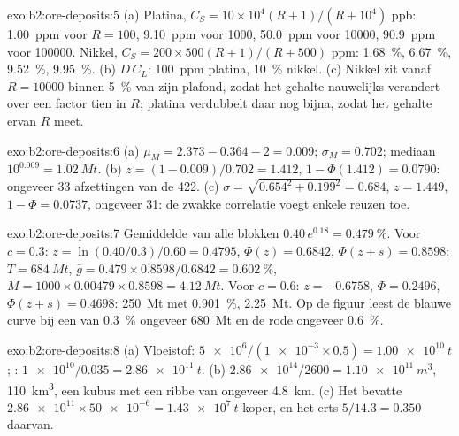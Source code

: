 \begin{solution}{exo:b2:ore-deposits:5}
(a) Platina, $C_S = 10 \times 10^4 (R + 1)/(R + 10^4)$ ppb: \qty{1.00}{ppm} voor $R = 100$,
\qty{9.10}{ppm} voor \num{1000}, \qty{50.0}{ppm} voor \num{10000}, \qty{90.9}{ppm} voor \num{100000}.
Nikkel, $C_S = 200 \times 500 (R + 1)/(R + 500)$ ppm: \qty{1.68}{\percent}, \qty{6.67}{\percent},
\qty{9.52}{\percent}, \qty{9.95}{\percent}. (b) $D\,C_L$: \qty{100}{ppm} platina,
\qty{10}{\percent} nikkel. (c) Nikkel zit vanaf $R = \num{10000}$ binnen \qty{5}{\percent} van zijn plafond,
zodat het gehalte nauwelijks verandert over een factor tien in $R$; platina verdubbelt daar nog
bijna, zodat het gehalte ervan $R$ meet.
\end{solution}

\begin{solution}{exo:b2:ore-deposits:6}
(a) $\mu_M = 2.373 - 0.364 - 2 = 0.009$; $\sigma_M = 0.702$; mediaan $10^{0.009} = \qty{1.02}{Mt}$.
(b) $z = (1 - 0.009)/0.702 = 1.412$, $1 - \Phi(1.412) = 0.0790$: ongeveer 33 afzettingen van de 422.
(c) $\sigma = \sqrt{0.654^2 + 0.199^2} = 0.684$, $z = 1.449$, $1 - \Phi = 0.0737$, ongeveer 31: de
zwakke correlatie voegt enkele reuzen toe.
\end{solution}

\begin{solution}{exo:b2:ore-deposits:7}
Gemiddelde van alle blokken $0.40\,e^{0.18} = \qty{0.479}{\percent}$. Voor $c = 0.3$: $z = \ln(0.40/0.3)/0.60 =
0.4795$, $\Phi(z) = 0.6842$, $\Phi(z + s) = 0.8598$: $T = \qty{684}{Mt}$, $\bar g = 0.479 \times
0.8598/0.6842 = \qty{0.602}{\percent}$, $M = 1000 \times 0.00479 \times 0.8598 = \qty{4.12}{Mt}$.
Voor $c = 0.6$: $z = -0.6758$, $\Phi = 0.2496$, $\Phi(z + s) = 0.4698$: \qty{250}{Mt} met
\qty{0.901}{\percent}, \qty{2.25}{Mt}. Op de figuur leest de blauwe curve bij een  van \qty{0.3}{\percent}
ongeveer \qty{680}{Mt} en de rode ongeveer \qty{0.6}{\percent}.
\end{solution}

\begin{solution}{exo:b2:ore-deposits:8}
(a) Vloeistof: $\num{5e6}/(\num{1e-3} \times 0.5) = \qty{1.00e10}{t}$; : $\num{1e10}/0.035 =
\qty{2.86e11}{t}$. (b) $\num{2.86e14}/2600 = \qty{1.10e11}{m^3}$, \qty{110}{km^3}, een kubus 
met een ribbe van ongeveer \qty{4.8}{km}. (c) Het  bevatte $\num{2.86e11}
\times \num{50e-6} = \qty{1.43e7}{t}$ koper, en het erts $5/14.3 = 0.350$ daarvan.
\end{solution}

